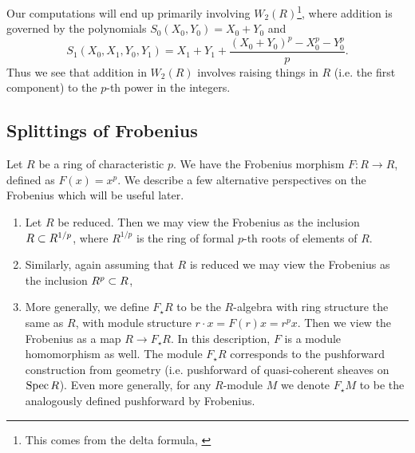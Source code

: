 \begin{rmk}
	\label{rmk:polyraise:w2}
    Our computations will end up primarily involving
    \(W_{2}(R)\)\footnote{
    This comes from the delta formula,
    \cite[Theorem~D]{kty-2022-fedder}},
    where addition is governed by the polynomials
	\(S_{0}(X_{0}, Y_{0}) = X_{0} + Y_{0}\)
	and
	\[
		S_{1}(X_{0}, X_{1}, Y_{0}, Y_{1})
		= X_{1} + Y_{1} + 
		\frac{(X_{0} + Y_{0})^{p} - X_{0}^{p} - Y_{0}^{p}}{p}
	.\] 
	Thus we see that addition in \(W_{2}(R)\) involves raising 
	things in \(R\) (i.e. the first component) to the \(p\)-th
	power in the integers.
\end{rmk}




\subsection{Splittings of Frobenius}

Let \(R\) be a ring of characteristic \(p\). 
We have the Frobenius morphism 
\(F \colon R \xrightarrow{} R\), 
defined as \(F(x) = x^p\).
We describe a few alternative perspectives on
the Frobenius which will be useful later.

\begin{rmk}
	\label{rmk:frob:perspectives}

    \begin{enumerate}[(1)]
    	\item Let \(R\) be reduced. 
    		Then we may view the Frobenius as the inclusion
    		\(R \subset R^{1 / p}\), where \(R^{1 / p}\) 
    		is the ring of formal \(p\)-th roots of elements
    		of \(R\).
    	\item Similarly, again assuming that \(R\) is reduced
    		we may view the Frobenius as the inclusion
    		\(R^{p} \subset R\), 
    	\item More generally, we define \(F_{\star}R\) to
			be the \(R\)-algebra with ring structure 
			the same as \(R\), with module structure
			\(r \cdot x = F(r)x = r^{p}x\).
			Then we view the Frobenius as a map
			\(R \xrightarrow{} F_{\star}R\).
			In this description, \(F\) is a module 
			homomorphism as well. 
			The module \(F_{\star}R\) corresponds to the
			pushforward construction from geometry
			(i.e. pushforward of quasi-coherent
			sheaves on \(\operatorname{Spec} R\)).
			Even more generally, for any \(R\)-module
			\(M\) we denote \(F_{\star}M\) to be
			the analogously defined pushforward by
			Frobenius.
    \end{enumerate}
\end{rmk}


